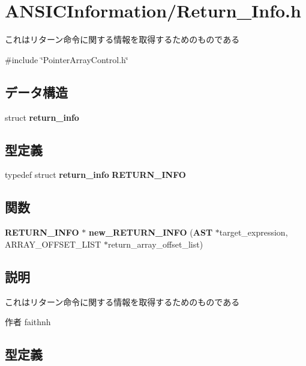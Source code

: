 \section{ANSICInformation/Return\_\-Info.h}
\label{_return___info_8h}


これはリターン命令に関する情報を取得するためのものである  


{\ttfamily \#include \char`\"{}PointerArrayControl.h\char`\"{}}\par
\subsection*{データ構造}
\begin{DoxyCompactItemize}
\item 
struct {\bf return\_\-info}
\end{DoxyCompactItemize}
\subsection*{型定義}
\begin{DoxyCompactItemize}
\item 
typedef struct {\bf return\_\-info} {\bf RETURN\_\-INFO}
\end{DoxyCompactItemize}
\subsection*{関数}
\begin{DoxyCompactItemize}
\item 
{\bf RETURN\_\-INFO} $\ast$ {\bf new\_\-RETURN\_\-INFO} ({\bf AST} $\ast$target\_\-expression, ARRAY\_\-OFFSET\_\-LIST $\ast$return\_\-array\_\-offset\_\-list)
\end{DoxyCompactItemize}


\subsection{説明}
これはリターン命令に関する情報を取得するためのものである \begin{DoxyAuthor}{作者}
faithnh 
\end{DoxyAuthor}


\subsection{型定義}
